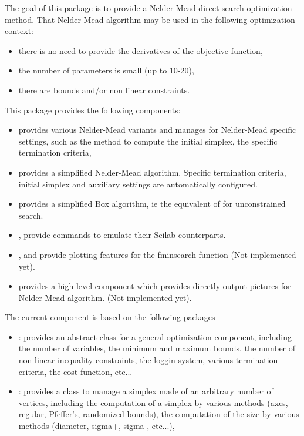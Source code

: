 %
\begin{Description}\relax
The goal of this package is to provide a Nelder-Mead direct search
optimization method. That Nelder-Mead algorithm may be used in the following
optimization context: \begin{itemize}

\item there is no need to provide the derivatives of the objective
function,
\item the number of parameters is small (up to 10-20),
\item there are bounds and/or non linear constraints.

\end{itemize}



This package provides the following components:\begin{itemize}

\item {} provides various Nelder-Mead variants and manages for
Nelder-Mead specific settings, such as the method to compute the initial
simplex, the specific termination criteria,
\item {} provides a simplified Nelder-Mead algorithm.
Specific termination criteria, initial simplex and auxiliary settings are 
automatically configured.
\item {} provides a simplified Box algorithm, ie the equivalent
of  for unconstrained search.
\item {},  provide commands to emulate their
Scilab counterparts.
\item {},  and 
provide plotting features for the fminsearch function (Not implemented
yet).
\item {} provides a high-level component which provides directly
output pictures for Nelder-Mead algorithm. (Not implemented yet).

\end{itemize}

The current component is based on the following packages \begin{itemize}

\item {}: provides an abstract class for a general optimization
component, including the number of variables, the minimum and maximum
bounds, the number of non linear inequality constraints, the loggin
system, various termination criteria, the cost function, etc...
\item {}: provides a class to manage a simplex made of an
arbitrary number of vertices, including the computation of a simplex by
various methods (axes, regular, Pfeffer's, randomized bounds), the
computation of the size by various methods (diameter, sigma+, sigma-,
etc...),


\end{itemize}
\end{Description}
